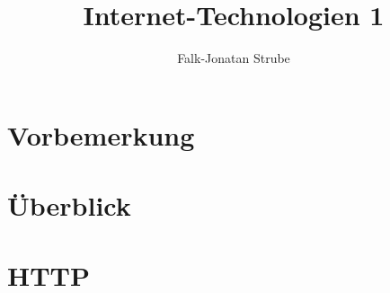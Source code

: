 \documentclass{scrreprt}
\title{Internet-Technologien 1}
\author{Falk-Jonatan Strube}
\begin{document}
\maketitle
\tableofcontents

\chapter*{Vorbemerkung}

\chapter{Überblick}


\chapter{HTTP}




\end{document}
